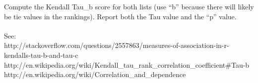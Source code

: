 Compute the Kendall Tau\_b score for both lists (use \enquote{b} because
there will likely be tie values in the rankings).  Report both the
Tau value and the \enquote{p} value.\\
\\
See:\\ 
http://stackoverflow.com/questions/2557863/measures-of-association-in-r-kendalls-tau-b-and-tau-c\\
http://en.wikipedia.org/wiki/Kendall\_tau\_rank\_correlation\_coefficient\#Tau-b\\
http://en.wikipedia.org/wiki/Correlation\_and\_dependence\\
